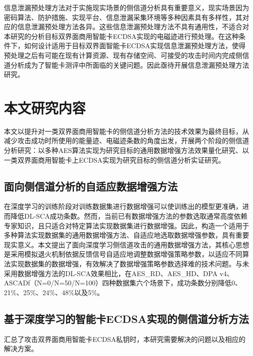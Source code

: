{	信息泄漏预处理方法对于实施现实场景的侧信道分析具有重要意义，现实场景因为密码算法、防护措施、实现平台、信息泄漏采集环境等多种因素具有多样性，其对应的信息泄漏预处理方法各异。这些信息泄漏预处理方法不具有通用性，不适合对本研究的分析目标双界面商用智能卡ECDSA实现的电磁迹进行预处理。在这种条件下，如何设计适用于目标双界面智能卡ECDSA实现信息泄漏预处理方法，使得预处理之后有可能在现有计算资源、现有存储空间、可接受的攻击时间内完成侧信道分析成为了智能卡测评中所面临的关键问题。因此亟待开展信息泄漏预处理方法研究。
	\section{本文研究内容}
	本文以提升对一类双界面商用智能卡的侧信道分析方法的技术效果为最终目标，从减少攻击成功时所使用的能量迹、电磁迹条数的角度出发，开展两个阶段的侧信道分析研究：以多种AES算法实现为研究目标的通用数据增强方法效果量化研究、以一类双界面商用智能卡上ECDSA实现为研究目标的侧信道分析实证研究。
	\subsection{面向侧信道分析的自适应数据增强方法}
	在深度学习的训练阶段对训练数据集进行数据增强可以使训练出的模型更准确，进而降低DL-SCA成功条数。然而，当前已有数据增强方法的参数选取通常高度依赖专家知识，且只适合对特定算法实现数据集进行数据增强。因此，构造一个适用于多种算法实现数据集的通用数据增强方法、自适应地选取数据增强参数，具有重要现实意义。本文提出了面向深度学习侧信道攻击的通用数据增强方法，其核心思想是采用模拟退火机制依据反馈信号自适应地调整数据增强策略参数，以适应不同算法实现数据集的数据增强，有效解决了数据增强策略参数选择难的技术问题。与未采用数据增强方法的DL-SCA效果相比，在AES\_RD、AES\_HD、DPA v4、ASCADf（N=0/N=50/N=100）四种数据集六个场景下，成功条数分别降低0、21\%、25\%、24\%、48\%以及5\%。
	\subsection{基于深度学习的智能卡ECDSA实现的侧信道分析方法}
	汇总了攻击双界面商用智能卡ECDSA私钥时，本研究需要解决的问题以及相应的解决方案。
	
}
